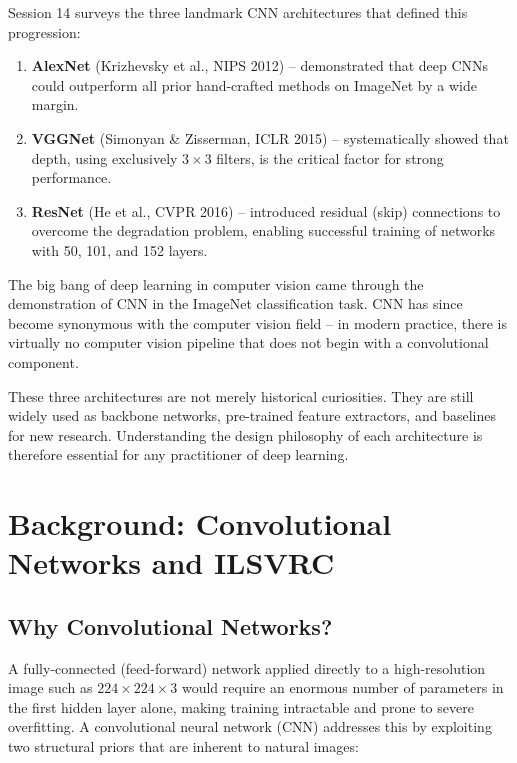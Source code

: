 \documentclass[12pt,a4paper]{article}
\begin{document}
Session 14 surveys the three landmark CNN architectures that defined this progression:
\begin{enumerate}[leftmargin=2em]
  \item \textbf{AlexNet} (Krizhevsky et al., NIPS 2012) -- demonstrated that deep CNNs could outperform all prior hand-crafted methods on ImageNet by a wide margin.
  \item \textbf{VGGNet} (Simonyan \& Zisserman, ICLR 2015) -- systematically showed that depth, using exclusively $3{\times}3$ filters, is the critical factor for strong performance.
  \item \textbf{ResNet} (He et al., CVPR 2016) -- introduced residual (skip) connections to overcome the degradation problem, enabling successful training of networks with 50, 101, and 152 layers.
\end{enumerate}

\begin{keyinsight}
The big bang of deep learning in computer vision came through the demonstration of CNN in the ImageNet classification task. CNN has since become synonymous with the computer vision field -- in modern practice, there is virtually no computer vision pipeline that does not begin with a convolutional component.
\end{keyinsight}

These three architectures are not merely historical curiosities. They are still widely used as backbone networks, pre-trained feature extractors, and baselines for new research. Understanding the design philosophy of each architecture is therefore essential for any practitioner of deep learning.

\section{Background: Convolutional Networks and ILSVRC}
\label{sec:background}

\subsection{Why Convolutional Networks?}

A fully-connected (feed-forward) network applied directly to a high-resolution image such as $224 \times 224 \times 3$ would require an enormous number of parameters in the first hidden layer alone, making training intractable and prone to severe overfitting. A convolutional neural network (CNN) addresses this by exploiting two structural priors that are inherent to natural images:
\end{document}
